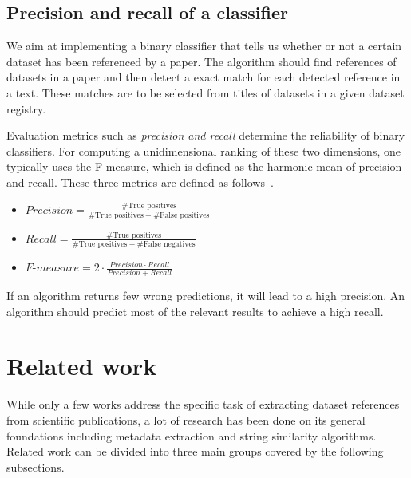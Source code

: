 \documentclass{IOS-Book-Article}
\begin{document}
\subsection{Precision and recall of a classifier}
\label{sec:precision-recall}
We aim at implementing a binary classifier that tells us whether or not a certain dataset has been referenced by a paper.
The algorithm should find references of datasets in a paper and then detect a exact match for each detected reference in a text.
These matches are to be selected from titles of datasets in a given dataset registry.

Evaluation metrics such as \emph{precision and recall} determine the reliability of binary classifiers.
For computing a unidimensional ranking of these two dimensions, one typically uses the F-measure, which is defined as the harmonic mean of precision and recall. 
These three metrics are defined as follows~\cite{Powers2011}. 
\begin{itemize}
	\item $\mathit{Precision}=\frac{\#\text{True\ positives}}{\#\text{True positives}+\#\text{False positives}}$
	\item $\mathit{Recall}=\frac{\#\text{True positives}}{\#\text{True positives}+\#\text{False negatives}}$
	\item $\textit{F-measure}=2\cdot{\frac{\mathit{Precision}\cdot\mathit{Recall}}{\mathit{Precision}+\mathit{Recall}}}$
\end{itemize}

If an algorithm returns few wrong predictions, it will lead to a high precision.
An algorithm should predict most of the relevant results to achieve a high recall.

\section{Related work}
\label{sec:relWork}
While only a few works address the specific task of extracting dataset references from scientific publications, a lot of research has been done on its general foundations including metadata extraction and string similarity algorithms. 
Related work can be divided into three main groups covered by the following subsections.
\end{document}
